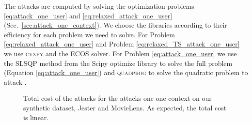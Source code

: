 The attacks are computed by solving the optimization problems \ref{eq:attack_one_user} and \ref{eq:relaxed_attack_one_user} (Sec.~\ref{sec:attack_one_context}). We choose the libraries according to their efficiency for each problem we need to solve. For Problem \eqref{eq:relaxed_attack_one_user} and Problem \eqref{eq:relaxed_TS_attack_one_user} we use \textsc{cvxpy}  \cite{cvxpy_rewriting} and the \textsc{ECOS} solver. %
For Problem \eqref{eq:attack_one_user} we use the \textsc{SLSQP} method from the Scipy optimize library \cite{scipy} to solve the full \linucb problem (Equation \ref{eq:attack_one_user}) and \textsc{quadprog} to solve the quadratic problem to attack \epsgreedy.


\begin{figure}[htbp]
    \centering
    \hfill
    \hfill
    \caption{Total cost of the attacks for the attacks one one context on our synthetic dataset, Jester and MovieLens. As expected, the total cost is linear.}
    \label{fig:cost_attack_one_ctx}
\end{figure}